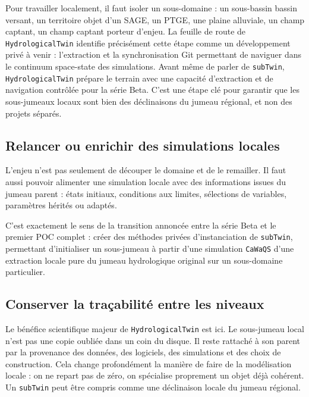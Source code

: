 \documentclass[11pt,a4paper]{article}
\newcommand{\hydrot}{\texttt{HydrologicalTwin}}
\newcommand{\subt}{\texttt{subTwin}}
\newcommand{\caw}{\texttt{CaWaQS}}
\begin{document}

Pour travailler localement, il faut isoler un sous-domaine : un sous-bassin bassin versant, un territoire objet d'un SAGE, un PTGE, une plaine alluviale, un champ captant, un champ captant porteur d'enjeu. La feuille de route de \hydrot{} identifie précisément cette étape comme un développement privé à venir : l'extraction et la synchronisation Git permettant de naviguer dans le continuum space-state des simulations. Avant même de parler de \subt , \hydrot{} prépare le terrain avec une capacité d'extraction et de navigation contrôlée pour la série Beta. C'est une étape clé pour garantir que les sous-jumeaux locaux sont bien des déclinaisons du jumeau régional, et non des projets séparés.

\subsection{Relancer ou enrichir des simulations locales}

L'enjeu n'est pas seulement de découper le domaine et de le remailler. Il faut aussi pouvoir alimenter une simulation locale avec des informations issues du jumeau parent : états initiaux, conditions aux limites, sélections de variables, paramètres hérités ou adaptés.

C'est exactement le sens de la transition annoncée entre la série Beta et le premier POC complet : créer des méthodes privées d'instanciation de \subt , permettant d'initialiser un sous-jumeau à partir d'une simulation \caw{} d'une extraction locale pure du jumeau hydrologique original sur un sous-domaine particulier.

\subsection{Conserver la traçabilité entre les niveaux}

Le bénéfice scientifique majeur de \hydrot{} est ici. Le sous-jumeau local n'est pas une copie oubliée dans un coin du disque. Il reste rattaché à son parent par la provenance des données, des logiciels, des simulations et des choix de construction. Cela change profondément la manière de faire de la modélisation locale : on ne repart pas de zéro, on spécialise proprement un objet déjà cohérent. Un \subt{} peut être compris comme une déclinaison locale du jumeau régional.
\end{document}
